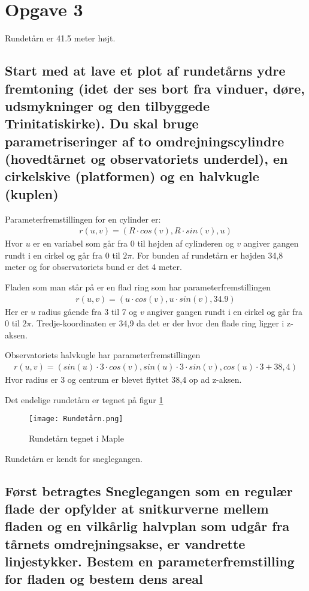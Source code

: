 \section{Opgave 3}
Rundetårn er 41.5 meter højt.

\subsection{Start med at lave et plot af rundetårns ydre fremtoning (idet der ses bort fra vinduer, døre, udsmykninger og den tilbyggede Trinitatiskirke). Du skal bruge parametriseringer af to omdrejningscylindre (hovedtårnet og observatoriets underdel), en cirkelskive (platformen) og en halvkugle (kuplen)}

Parameterfremstillingen for en cylinder er:
\begin{align}
    r(u,v) =(R \cdot cos(v), R \cdot sin(v), u) 
\end{align}
Hvor $u$ er en variabel som går fra 0 til højden af cylinderen og $v$ angiver gangen rundt i en cirkel og går fra 0 til $2\pi$. For bunden af rundetårn er højden 34,8 meter og for observatoriets bund er det 4 meter. 

Fladen som man står på er en flad ring som har parameterfremstillingen
\begin{align}
    r(u,v) = (u \cdot cos(v), u \cdot sin(v), 34.9)
\end{align}
Her er $u$ radius gående fra 3 til 7 og $v$ angiver gangen rundt i en cirkel og går fra 0 til $2\pi$. Tredje-koordinaten er 34,9 da det er der hvor den flade ring ligger i z-aksen.

Observatoriets halvkugle har parameterfremstillingen
\begin{align}
    r(u,v) = (sin(u) \cdot 3 \cdot cos(v),sin(u) \cdot 3 \cdot sin(v),cos(u) \cdot 3+38,4)
\end{align}
Hvor radius er 3 og centrum er blevet flyttet 38,4 op ad z-aksen.

Det endelige rundetårn er tegnet på figur \ref{rund}
\begin{figure}[htp]
    \centering
    \texttt{[image: Rundetårn.png]}
        \caption{Rundetårn tegnet i Maple}
    \label{rund}
\end{figure}

\newpage

Rundetårn er kendt for sneglegangen.
\subsection{Først betragtes Sneglegangen som en regulær flade der opfylder at snitkurverne mellem fladen og en vilkårlig halvplan som udgår fra tårnets omdrejningsakse, er vandrette linjestykker. Bestem en parameterfremstilling for fladen og bestem dens areal}

